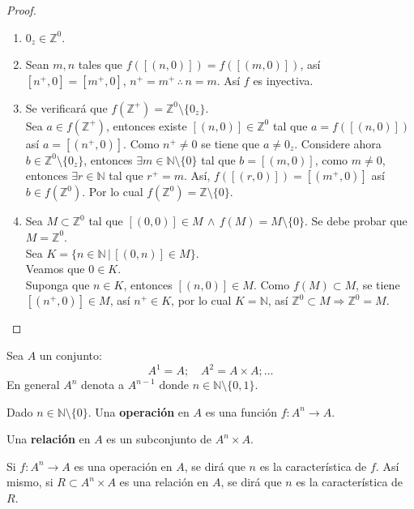 \begin{proof}
  \begin{enumerate}
    \item $0_z \in \mathbb{Z}^0$.
    \item Sean $m,n$ tales que $f([(n,0)])=f([(m,0)])$, así $[n^+,0] = [m^+,
      0]$, $n^+ = m^+ \, \therefore \, n = m$. Así $f$ es inyectiva.
    \item Se verificará que $f(\mathbb{Z}^+) = \mathbb{Z}^0
      \setminus\{0_z\}$.\\
      Sea $a\in f(\mathbb{Z}^+)$, entonces existe $[(n,0)] \in
      \mathbb{Z}^0$ tal que $a = f([(n,0)])$ así $a = [(n^+,0)]$. Como $n^+
      \neq 0$ se tiene que $a \neq 0_z$. Considere ahora $b \in
      \mathbb{Z}^0\setminus\{0_z\}$, entonces $\exists m \in
      \mathbb{N}\setminus\{0\}$ tal que $b = [(m,0)]$, como $m \neq 0$,
      entonces $\exists r\in \mathbb{N}$ tal que $r^+ = m$. Así,
      $f([(r,0)])= [(m^+,0)]$ así $b \in f(\mathbb{Z}^0)$. Por lo cual
      $f(\mathbb{Z}^0) = \mathbb{Z}\setminus\{0\}$.
    \item Sea $M \subset \mathbb{Z}^0$ tal que $[(0,0)] \in M \, \land \,
      f(M) = M \setminus\{0\}$. Se debe probar que $M = \mathbb{Z}^0$. \\
      Sea $K = \{n \in \mathbb{N} \, | \, [(0,n)] \in M\}$. \\
      Veamos que $0 \in K$. \\
      Suponga que $n \in K$, entonces $[(n,0)] \in M$. Como $f(M) \subset
      M$, se tiene $[(n^+,0)] \in M$, así $n^+ \in K$, por lo cual $K=
      \mathbb{N}$, así $\mathbb{Z}^0 \subset M \Rightarrow \mathbb{Z}^0 =
      M$. 
  \end{enumerate}
\end{proof}
Sea $A$ un conjunto:
\[
  A^1 = A ;\quad A^2 = A \times A; \ldots
\]
En general $A^n$ denota a $A^{n-1}$ donde $n \in \mathbb{N}\setminus \{0,1\}$.\\
\begin{definition}
  Dado $n \in \mathbb{N}\setminus \{0\}$. Una \textbf{operación} en $A$ es una
  función $f: A^n \rightarrow A$.
\end{definition}
\begin{definition}
  Una \textbf{relación} en $A$ es un subconjunto de $A^n \times A$.
\end{definition}
\begin{definition}
  Si $f: A^n \rightarrow A$ es una operación en $A$, se dirá que $n$ es la
  característica de $f$. Así mismo, si $R \subset A^n \times A$ es una
  relación en $A$, se dirá que $n$ es la característica de $R$.
\end{definition}
